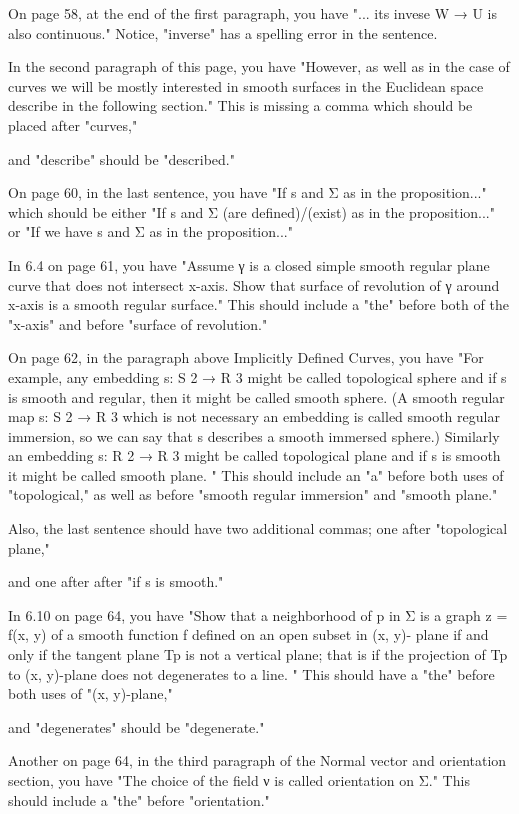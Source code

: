  On page 58, at the end of the first paragraph, you have "... its invese W → U is also continuous." Notice, "inverse" has a spelling error in the sentence. 
 
 In the second paragraph of this page, you have "However, as well as in the case of curves we will be mostly interested in smooth surfaces in the Euclidean space describe in the following section." This is missing a comma which should be placed after "curves," 
 
 and "describe" should be "described." 
 
 On page 60, in the last sentence, you have "If s and Σ as in the proposition..." which should be either "If s and Σ (are defined)/(exist) as in the proposition..." or "If we have s and Σ as in the proposition..." 
 
 In 6.4 on page 61, you have "Assume γ is a closed simple smooth regular plane curve that does not intersect x-axis. Show that surface of revolution of γ around x-axis is a smooth regular surface." This should include a "the" before both of the "x-axis" and before "surface of revolution." 
 
 On page 62, in the paragraph above Implicitly Defined Curves, you have "For example, any embedding s: S 2 → R 3 might be called topological sphere and if s is smooth and regular, then it might be called smooth sphere. (A smooth regular map s: S 2 → R 3 which is not necessary an embedding is called smooth regular immersion, so we can say that s describes a smooth immersed sphere.) Similarly an embedding s: R 2 → R 3 might be called topological plane and if s is smooth it might be called smooth plane. " This should include an "a" before both uses of "topological," as well as before "smooth regular immersion" and "smooth plane." 
 
 Also, the last sentence should have two additional commas; one after "topological plane," 
 
 and one after after "if s is smooth." 
 
 In 6.10 on page 64, you have "Show that a neighborhood of p in Σ is a graph z = f(x, y) of a smooth function f defined on an open subset in (x, y)- plane if and only if the tangent plane Tp is not a vertical plane; that is if the projection of Tp to (x, y)-plane does not degenerates to a line. " 
 This should have a "the" before both uses of "(x, y)-plane," 
 
 and "degenerates" should be "degenerate." 
 
 Another on page 64, in the third paragraph of the Normal vector and orientation section, you have "The choice of the field ν is called orientation on Σ." This should include a "the" before "orientation." 
 
